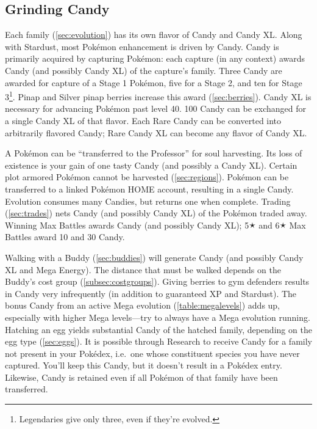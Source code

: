 \subsection{Grinding Candy\label{subsec:getcandy}}
Each family (\autoref{sec:evolution}) has its own flavor of Candy and Candy XL\@.
Along with Stardust, most Pokémon enhancement is driven by Candy.
Candy is primarily acquired by capturing Pokémon: each capture (in any context)
  awards Candy (and possibly Candy XL) of the capture's family.
Three Candy are awarded for capture of a Stage 1 Pokémon, five for a Stage 2,
  and ten for Stage 3\footnote{Legendaries give only three, even if they're evolved.}.
Pinap and Silver pinap berries increase this award (\autoref{sec:berries}).
Candy XL is necessary for advancing Pokémon past level 40.
100 Candy can be exchanged for a single Candy XL of that flavor.
Each Rare Candy can be converted into arbitrarily flavored Candy; Rare Candy XL can become any flavor of Candy XL\@.

A Pokémon can be ``transferred to the Professor'' for soul harvesting.
Its loss of existence is your gain of one tasty Candy (and possibly a Candy XL).
Certain plot armored Pokémon cannot be harvested (\autoref{sec:regions}).
Pokémon can be transferred to a linked Pokémon HOME account, resulting in a single Candy.
Evolution consumes many Candies, but returns one when complete.
Trading (\autoref{sec:trades}) nets Candy (and possibly Candy XL) of the Pokémon traded away.
Winning Max Battles awards Candy (and possibly Candy XL);
 5🟉 and 6🟉 Max Battles award 10 and 30 Candy.

Walking with a Buddy (\autoref{sec:buddies}) will generate Candy (and possibly Candy XL and Mega Energy).
The distance that must be walked depends on the Buddy's cost group (\autoref{subsec:costgroups}).
Giving berries to gym defenders results in Candy very infrequently (in addition to guaranteed XP and Stardust).
The bonus Candy from an active Mega evolution (\autoref{table:megalevels}) adds up, especially
 with higher Mega levels---try to always have a Mega evolution running.
Hatching an egg yields substantial Candy of the hatched family, depending on the egg type (\autoref{sec:eggs}).
It is possible through Research to receive Candy for a family not present in
  your Pokédex, i.e.\ one whose constituent species you have never captured.
You'll keep this Candy, but it doesn't result in a Pokédex entry.
Likewise, Candy is retained even if all Pokémon of that family have been transferred.
